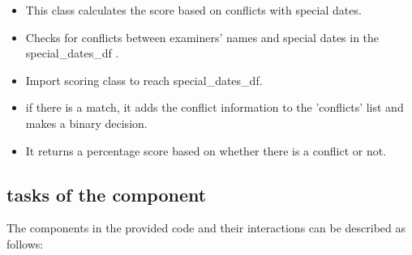 \begin{itemize}
\item This class calculates the score based on conflicts with special dates.
\item Checks for conflicts between examiners' names and special dates in the special_dates_df .
\item Import scoring class to reach  special_dates_df.
\item if there is a match, it adds the conflict information to the 'conflicts' list and makes a binary decision.
\item It returns a percentage score based on whether there is a conflict or not.


\end{itemize}









\subsection{tasks of the component}
The components in the provided code and their interactions can be described as follows:

